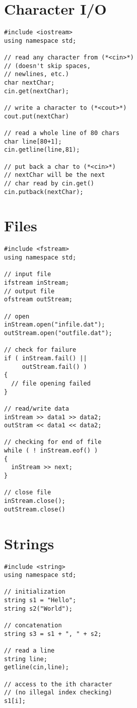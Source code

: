 \documentclass[10pt]{article}
\begin{document}
\begin{multicols*}{3}
\section*{Character I/O}
\small
\lstset {language=C++}
\begin{lstlisting}
#include <iostream>
using namespace std;

// read any character from (*<cin>*)
// (doesn't skip spaces, 
// newlines, etc.)
char nextChar;
cin.get(nextChar);

// write a character to (*<cout>*)
cout.put(nextChar)

// read a whole line of 80 chars
char line[80+1];
cin.getline(line,81);

// put back a char to (*<cin>*)
// nextChar will be the next
// char read by cin.get()
cin.putback(nextChar);
\end{lstlisting}
%
%
\section*{Files}
\small
\lstset {language=C++}
\begin{lstlisting}
#include <fstream>
using namespace std;

// input file
ifstream inStream;
// output file
ofstream outStream;

// open
inStream.open("infile.dat");
outStream.open("outfile.dat");

// check for failure
if ( inStream.fail() ||
     outStream.fail() )
{
  // file opening failed
}

// read/write data
inStream >> data1 >> data2;
outStram << data1 << data2;

// checking for end of file
while ( ! inStream.eof() )
{
  inStream >> next;
}

// close file
inStream.close();
outStream.close()
\end{lstlisting}
%
%
\section*{Strings}
\small
\lstset {language=C++}
\begin{lstlisting}
#include <string>
using namespace std;

// initialization
string s1 = "Hello";
string s2("World");

// concatenation
string s3 = s1 + ", " + s2;

// read a line
string line;
getline(cin,line);

// access to the ith character
// (no illegal index checking)
s1[i];


\end{lstlisting}
\end{multicols*}
\end{document}
